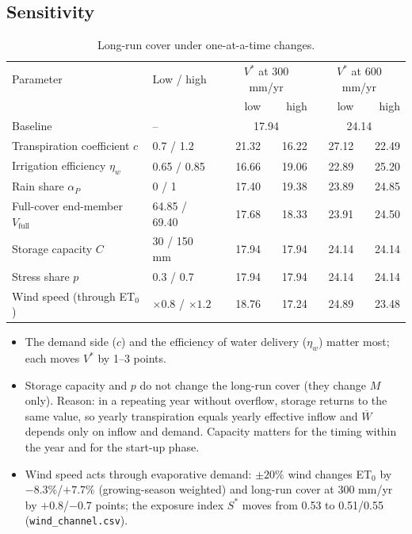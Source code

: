 \documentclass[11pt,a4paper]{article}
\newcommand{\Wb}{\overline W}
\begin{document}
\subsection{Sensitivity}
\begin{table}[H]\centering\small
\begin{tabular}{@{}llrrrr@{}}
\toprule
Parameter & Low / high & \multicolumn{2}{c}{$V^*$ at 300 mm/yr} & \multicolumn{2}{c}{$V^*$ at 600 mm/yr}\\
 & & low & high & low & high\\
\midrule
Baseline & -- & \multicolumn{2}{c}{17.94} & \multicolumn{2}{c}{24.14}\\
Transpiration coefficient $c$ & 0.7 / 1.2 & 21.32 & 16.22 & 27.12 & 22.49\\
Irrigation efficiency $\eta_w$ & 0.65 / 0.85 & 16.66 & 19.06 & 22.89 & 25.20\\
Rain share $\alpha_P$ & 0 / 1 & 17.40 & 19.38 & 23.89 & 24.85\\
Full-cover end-member $V_{\mathrm{full}}$ & 64.85 / 69.40 & 17.68 & 18.33 & 23.91 & 24.50\\
Storage capacity $C$ & 30 / 150 mm & 17.94 & 17.94 & 24.14 & 24.14\\
Stress share $p$ & 0.3 / 0.7 & 17.94 & 17.94 & 24.14 & 24.14\\
\midrule
Wind speed (through ET$_0$) & $\times0.8$ / $\times1.2$ & 18.76 & 17.24 & 24.89 & 23.48\\
\bottomrule
\end{tabular}
\caption{Long-run cover under one-at-a-time changes.}
\label{tab:sens}
\end{table}
\begin{itemize}
\item The demand side ($c$) and the efficiency of water delivery ($\eta_w$) matter most; each moves $V^*$ by 1--3 points.
\item Storage capacity and $p$ do not change the long-run cover (they change $M$ only). Reason: in a repeating year without
overflow, storage returns to the same value, so yearly transpiration equals yearly effective inflow and
$\Wb$ depends only on inflow and demand. Capacity matters for the timing within the year and for the start-up phase.
\item Wind speed acts through evaporative demand: $\pm20\%$ wind changes ET$_0$ by $-8.3\%$/$+7.7\%$ (growing-season weighted) and long-run cover at 300 mm/yr
by $+0.8$/$-0.7$ points; the exposure index $S^*$ moves from 0.53 to 0.51/0.55 (\texttt{wind\_channel.csv}).
\end{itemize}
\end{document}
